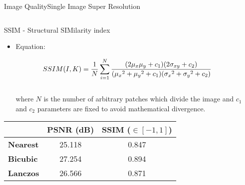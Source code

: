 \documentclass{standalone}
\begin{document}
\begin{frame}{Image Quality}{Single Image Super Resolution}
\begin{columns}
\begin{column}{0.65\textwidth}
\begin{alertblock}{SSIM - Structural SIMilarity index}
\begin{itemize}
          \item Equation:

          \begin{equation*}
          \hspace{-0.75cm}
          SSIM(I, K) = \frac{1}{N}\sum_{i=1}^{N} \frac{(2\mu_x\mu_y + c_1)(2\sigma_{xy} + c_2)}{ ({\mu_x}^2 + {\mu_y}^2 + c_1)({\sigma_x}^2 + {\sigma_y}^2 + c_2) }
          \end{equation*}
          \\
          where $N$ is the number of arbitrary patches which divide the image and $c_1$ and $c_2$ parameters are fixed to avoid mathematical divergence.

        \end{itemize}
      \end{alertblock}

      \begin{tabular}{lcc}
        \hline \rowcolor{DarkGreen!20!white}
                          & \textbf{PSNR (dB)} & \textbf{SSIM ($\in [-1, 1]$)} \\
        \hline
        \textbf{Nearest}  & 25.118             & 0.847                         \\
        \textbf{Bicubic}  & 27.254             & 0.894                         \\
        \textbf{Lanczos}  & 26.566             & 0.871                         \\
        \hline
      \end{tabular}
    \end{column}

  \end{columns}

\end{frame}
\end{document}
